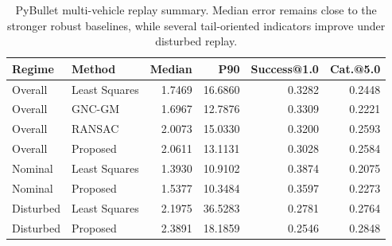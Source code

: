 \begin{table}[H]
\centering
\caption{PyBullet multi-vehicle replay summary. Median error remains close to the stronger robust baselines, while several tail-oriented indicators improve under disturbed replay.}
\label{tab:pybullet}
\small
\begin{tabular}{llrrrr}
\toprule
Regime & Method & Median & P90 & Success@1.0 & Cat.@5.0 \\
\midrule
Overall & Least Squares & 1.7469 & 16.6860 & 0.3282 & 0.2448 \\
Overall & GNC-GM & 1.6967 & 12.7876 & 0.3309 & 0.2221 \\
Overall & RANSAC & 2.0073 & 15.0330 & 0.3200 & 0.2593 \\
Overall & Proposed & 2.0611 & 13.1131 & 0.3028 & 0.2584 \\
\midrule
Nominal & Least Squares & 1.3930 & 10.9102 & 0.3874 & 0.2075 \\
Nominal & Proposed & 1.5377 & 10.3484 & 0.3597 & 0.2273 \\
\midrule
Disturbed & Least Squares & 2.1975 & 36.5283 & 0.2781 & 0.2764 \\
Disturbed & Proposed & 2.3891 & 18.1859 & 0.2546 & 0.2848 \\
\bottomrule
\end{tabular}
\end{table}

